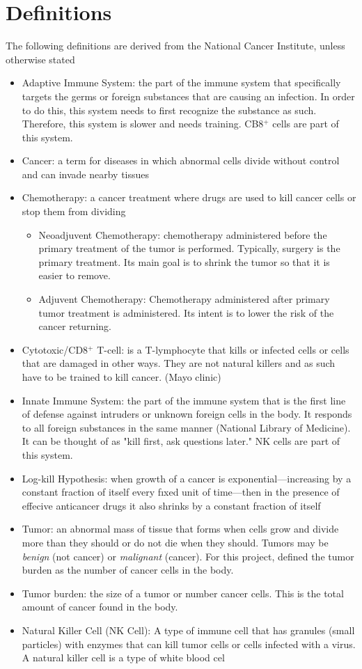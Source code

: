 \documentclass[11pt]{amsart}
\begin{document}
\appendix
\section{Definitions}
\label{appendix: defs}
The following definitions are derived from the National Cancer Institute, unless otherwise stated
\begin{itemize}
	\item Adaptive Immune System: the part of the immune system that specifically targets the germs or foreign substances that are causing an infection. In order to do this, this system needs to first recognize the substance as such. Therefore, this system is slower and needs training. CB8$^+$ cells are part of this system.
	\item Cancer:  a term for diseases in which abnormal cells divide without control and can invade nearby tissues
	\item Chemotherapy: a cancer treatment where drugs are used to kill cancer cells or stop them from dividing
		\begin{itemize}
			\item Neoadjuvent Chemotherapy: chemotherapy administered before the primary treatment of the tumor is performed. Typically, surgery is the primary treatment. Its main goal is to shrink the tumor so that it is easier to remove.
			\item Adjuvent Chemotherapy: Chemotherapy administered after primary tumor treatment is administered. Its intent is to lower the risk of the cancer returning.
		\end{itemize}
	\item Cytotoxic/CD8$^+$ T-cell: is a T-lymphocyte that kills or infected cells or cells that are damaged in other ways. They are not natural killers and as such have to be trained to kill cancer. (Mayo clinic)
	\item Innate Immune System: the part of the immune system that is the first line of defense against intruders or unknown foreign cells in the body. It responds to all foreign substances in the same manner (National Library of Medicine). It can be thought of as "kill first, ask questions later." NK cells are part of this system.
	\item Log-kill Hypothesis: when growth of a cancer is exponential—increasing by a constant fraction of itself every fıxed unit of time—then in the presence of effecive anticancer drugs it also shrinks by a constant fraction \cite{LogKill}
of itself
	\item Tumor: an abnormal mass of tissue that forms when cells grow and divide more than they should or do not die when they should. Tumors may be \textit{benign} (not cancer) or \textit{malignant} (cancer). For this project, defined the tumor burden as the number of cancer cells in the body.
	\item Tumor burden: the size of a tumor or number cancer cells. This is the total amount of cancer found in the body.
        \item Natural Killer Cell (NK Cell): A type of immune cell that has granules (small particles) with enzymes that can kill tumor cells or cells infected with a virus. A natural killer cell is a type of white blood cel
\end{itemize}
\end{document}
